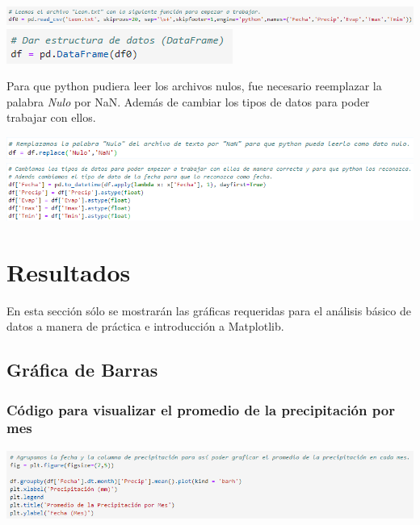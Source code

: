\documentclass{article}
\begin{document}
\begin{center}
    \includegraphics[scale = .65]{read.png}
    \includegraphics[scale = .8]{DataFrame.png}
\end{center}
\clearpage

Para que python pudiera leer los archivos nulos, fue necesario reemplazar la palabra \textit{Nulo} por NaN. Además de cambiar los tipos de datos para poder trabajar con ellos.
\begin{center}
    \includegraphics[scale = .74]{NaN.png}
    \includegraphics[scale = 0.65]{Float.png}
\end{center}

\section{Resultados}
\noindent En esta sección sólo se mostrarán las gráficas requeridas para el análisis básico de datos a manera de práctica e introducción a Matplotlib.

\subsection{Gráfica de Barras}
\subsubsection{Código para visualizar el promedio de la precipitación por mes}
\begin{center}
    \includegraphics[scale = 0.65]{CPrecip.png}
\end{center}
\end{document}
